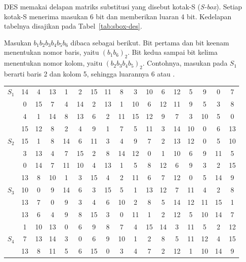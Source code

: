 DES memakai delapan matriks substitusi yang disebut kotak-S (\textit{S-box}).
Setiap kotak-S menerima masukan 6 bit dan memberikan luaran 4 bit. Kedelapan
tabelnya disajikan pada Tabel~\ref{tab:sbox-des}.

Masukan $b_1b_2b_3b_4b_5b_6$ dibaca sebagai berikut. Bit pertama dan bit keenam
menentukan nomor baris, yaitu $(b_1b_6)_2$. Bit kedua sampai bit kelima
menentukan nomor kolom, yaitu $(b_2b_3b_4b_5)_2$. Contohnya, masukan
 pada $S_1$ berarti baris 2 dan kolom 5, sehingga luarannya
6 atau .

\begin{table}[htbp]
\centering
\footnotesize
\setlength{\tabcolsep}{3.5pt}
\begin{tabular}{@{}l@{\hspace{5pt}}*{16}{c}@{}}
$S_1$ & 14 & 4 & 13 & 1 & 2 & 15 & 11 & 8 & 3 & 10 & 6 & 12 & 5 & 9 & 0 & 7 \\
      & 0 & 15 & 7 & 4 & 14 & 2 & 13 & 1 & 10 & 6 & 12 & 11 & 9 & 5 & 3 & 8 \\
      & 4 & 1 & 14 & 8 & 13 & 6 & 2 & 11 & 15 & 12 & 9 & 7 & 3 & 10 & 5 & 0 \\
      & 15 & 12 & 8 & 2 & 4 & 9 & 1 & 7 & 5 & 11 & 3 & 14 & 10 & 0 & 6 & 13 \\[4pt]
$S_2$ & 15 & 1 & 8 & 14 & 6 & 11 & 3 & 4 & 9 & 7 & 2 & 13 & 12 & 0 & 5 & 10 \\
      & 3 & 13 & 4 & 7 & 15 & 2 & 8 & 14 & 12 & 0 & 1 & 10 & 6 & 9 & 11 & 5 \\
      & 0 & 14 & 7 & 11 & 10 & 4 & 13 & 1 & 5 & 8 & 12 & 6 & 9 & 3 & 2 & 15 \\
      & 13 & 8 & 10 & 1 & 3 & 15 & 4 & 2 & 11 & 6 & 7 & 12 & 0 & 5 & 14 & 9 \\[4pt]
$S_3$ & 10 & 0 & 9 & 14 & 6 & 3 & 15 & 5 & 1 & 13 & 12 & 7 & 11 & 4 & 2 & 8 \\
      & 13 & 7 & 0 & 9 & 3 & 4 & 6 & 10 & 2 & 8 & 5 & 14 & 12 & 11 & 15 & 1 \\
      & 13 & 6 & 4 & 9 & 8 & 15 & 3 & 0 & 11 & 1 & 2 & 12 & 5 & 10 & 14 & 7 \\
      & 1 & 10 & 13 & 0 & 6 & 9 & 8 & 7 & 4 & 15 & 14 & 3 & 11 & 5 & 2 & 12 \\[4pt]
$S_4$ & 7 & 13 & 14 & 3 & 0 & 6 & 9 & 10 & 1 & 2 & 8 & 5 & 11 & 12 & 4 & 15 \\
      & 13 & 8 & 11 & 5 & 6 & 15 & 0 & 3 & 4 & 7 & 2 & 12 & 1 & 10 & 14 & 9 \\

\end{tabular}
\end{table}
